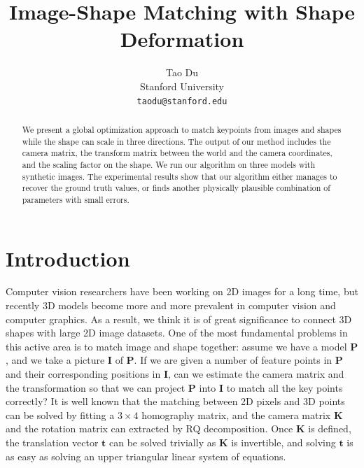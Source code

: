 \documentclass[10pt,twocolumn,letterpaper]{article}
\begin{document}
\title{Image-Shape Matching with Shape Deformation}

\author{Tao Du\\
Stanford University\\
{\tt\small taodu@stanford.edu}
}

\maketitle

\begin{abstract}
\noindent
We present a global optimization approach to match keypoints from images and shapes while the shape can scale in three directions. The output of our method includes the camera matrix, the transform matrix between the world and the camera coordinates, and the scaling factor on the shape. We run our algorithm on three models with synthetic images. The experimental results show that our algorithm either manages to recover the ground truth values, or finds another physically plausible combination of parameters with small errors.
\end{abstract}

\section{Introduction}

\noindent
Computer vision researchers have been working on 2D images for a long time, but recently 3D models become more and more prevalent in computer vision and computer graphics. As a result, we think it is of great significance to connect 3D shapes with large 2D image datasets. One of the most fundamental problems in this active area is to match image and shape together: assume we have a model $\mathbf{P}$, and we take a picture $\mathbf{I}$ of $\mathbf{P}$. If we are given a number of feature points in $\mathbf{P}$ and their corresponding positions in $\mathbf{I}$, can we estimate the camera matrix and the transformation so that we can project $\mathbf{P}$ into $\mathbf{I}$ to match all the key points correctly? It is well known that the matching between 2D pixels and 3D points can be solved by fitting a $3\times 4$ homography matrix, and the camera matrix $\mathbf{K}$ and the rotation matrix can extracted by RQ decomposition. Once $\mathbf{K}$ is defined, the translation vector $\mathbf{t}$ can be solved trivially as $\mathbf{K}$ is invertible, and solving $\mathbf{t}$ is as easy as solving an upper triangular linear system of equations.\\
\end{document}
